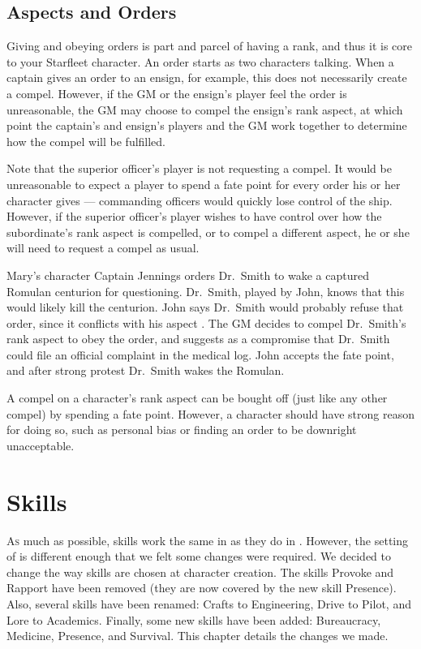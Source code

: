 \documentclass[12pt,titlepage,openany]{book}
\begin{document}
\section{Aspects and Orders}\label{sec:aspects-orders}

Giving and obeying orders is part and parcel of having a rank, and thus it is
core to your Starfleet character. An order starts as two characters talking.
When a captain gives an order to an ensign, for example, this does not
necessarily create a compel. However, if the GM or the ensign's player feel the
order is unreasonable, the GM may choose to compel the ensign's rank aspect,
at which point the captain's and ensign's players and the GM work together to
determine how the compel will be fulfilled.

Note that the superior officer's player is not requesting a compel. It would be
unreasonable to expect a player to spend a fate point for every order his or
her character gives --- commanding officers would quickly lose control of the
ship. However, if the superior officer's player wishes to have control over
how the subordinate's rank aspect is compelled, or to compel a different
aspect, he or she will need to request a compel as usual.

\begin{example}
    Mary's character Captain Jennings orders Dr.\ Smith to wake a captured
    Romulan centurion for questioning. Dr.\ Smith, played by John, knows that
    this would likely kill the centurion. John says Dr.\ Smith would probably
    refuse that order, since it conflicts with his aspect .
    The GM decides to compel Dr.\ Smith's rank aspect  to
    obey the order, and suggests as a compromise that Dr.\ Smith could file an
    official complaint in the medical log. John accepts the fate point, and
    after strong protest Dr.\ Smith wakes the Romulan.
\end{example}

A compel on a character's rank aspect can be bought off (just like any other
compel) by spending a fate point. However, a character should have strong
reason for doing so, such as personal bias or finding an order to be downright
unacceptable.



\chapter{Skills}\label{chap:skills}

\lettrine[lines=1]{A}{s} much as possible, skills work the same in
\StarTrekFate{} as they do in \FateCore{}. However, the setting of \StarTrek{}
is different enough that we felt some changes were required. We decided to
change the way skills are chosen at character creation. The skills Provoke and
Rapport have been removed (they are now covered by the new skill Presence).
Also, several skills have been renamed: Crafts to Engineering, Drive to Pilot,
and Lore to Academics. Finally, some new skills have been added: Bureaucracy,
Medicine, Presence, and Survival. This chapter details the changes we made.
\end{document}
